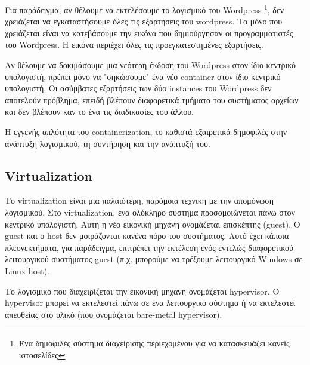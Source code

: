 Για παράδειγμα, αν θέλουμε να εκτελέσουμε το λογισμικό του
\textlatin{Wordpress} \footnote{Ένα δημοφιλές σύστημα διαχείρισης περιεχομένου
για να κατασκευάζει κανείς ιστοσελίδες}, δεν χρειάζεται να εγκαταστήσουμε όλες τις
εξαρτήσεις του \textlatin{wordpress}. Το μόνο που χρειάζεται είναι να
κατεβάσουμε την εικόνα που δημιούργησαν οι προγραμματιστές του
\textlatin{Wordpress}. Η εικόνα περιέχει όλες τις προεγκατεστημένες εξαρτήσεις.

Αν θέλουμε να δοκιμάσουμε μια νεότερη έκδοση του \textlatin{Wordpress} στον ίδιο
κεντρικό υπολογιστή, πρέπει μόνο να "σηκώσουμε" ένα νέο \textlatin{container}
στον ίδιο κεντρικό υπολογιστή. Οι ασύμβατες εξαρτήσεις των δύο
\textlatin{instances} του \textlatin{Wordpress} δεν αποτελούν πρόβλημα, επειδή
βλέπουν διαφορετικά τμήματα του συστήματος αρχείων και δεν βλέπουν καν το ένα
τις διαδικασίες του άλλου.

Η εγγενής απλότητα του \textlatin{containerization}, το  καθιστά εξαιρετικά
δημοφιλές στην ανάπτυξη λογισμικού, τη συντήρηση και την ανάπτυξή του.


\subsection{\textlatin{Virtualization}}

Το \textlatin{virtualization} είναι μια παλαιότερη, παρόμοια τεχνική με την
απομόνωση λογισμικού. Στο \textlatin{virtualization}, ένα ολόκληρο σύστημα
προσομοιώνεται πάνω στον κεντρικό υπολογιστή. Αυτή η νέο εικονική
μηχάνη ονομάζεται επισκέπτης (\textlatin{guest}). Ο \textlatin{guest} και ο
\textlatin{host} δεν μοιράζονται κανένα πόρο του συστήματος. Αυτό έχει κάποια
πλεονεκτήματα, για παράδειγμα, επιτρέπει την εκτέλεση
ενός εντελώς διαφορετικού λειτουργικού συστήματος \textlatin{guest} 
(π.χ. μπορούμε να τρέξουμε λειτουργικό \textlatin{Windows} σε
\textlatin{Linux host}).

Το λογισμικό που διαχειρίζεται την εικονική μηχανή ονομάζεται \textlatin{hypervisor}.
Ο \textlatin{hypervisor} μπορεί να εκτελεστεί πάνω σε ένα λειτουργικό σύστημα ή
να εκτελεστεί απευθείας στο υλικό (που ονομάζεται 
\textlatin{bare-metal hypervisor}).



